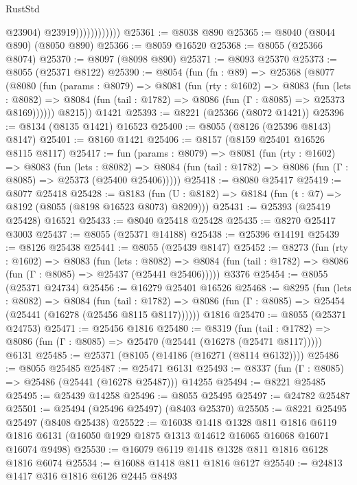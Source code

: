 \begin{lexlean}{RustStd}
\begin{coremodule}
                              @23904)
                            @23919))))))))))))
@25361 := @8038 @890
@25365 := @8040 (@8044 @890) (@8050 @890)
@25366 := @8059 @16520
@25368 := @8055 (@25366 @8074)
@25370 := @8097 (@8098 @890)
@25371 := @8093 @25370
@25373 := @8055 (@25371 @8122)
@25390 := @8054
    (fun (fn : @89) =>
    @25368
      (@8077
        (@8080
          (fun (params : @8079) =>
          @8081
            (fun (rty : @1602) =>
            @8083
              (fun (lets : @8082) =>
              @8084 (fun (tail : @1782) => @8086 (fun (Γ : @8085) => @25373 @8169))))))
        @8215))
    @1421
@25393 := @8221 (@25366 (@8072 @1421))
@25396 := @8134 (@8135 @1421) @16523
@25400 := @8055 (@8126 (@25396 @8143) @8147)
@25401 := @8160 @1421
@25406 := @8157 (@8159 @25401 @16526 @8115 @8117)
@25417 := fun (params : @8079) =>
  @8081
    (fun (rty : @1602) =>
    @8083
      (fun (lets : @8082) =>
      @8084 (fun (tail : @1782) => @8086 (fun (Γ : @8085) => @25373 (@25400 @25406)))))
@25418 := @8080 @25417
@25419 := @8077 @25418
@25428 := @8183
    (fun (U : @8182) => @8184 (fun (t : @7) => @8192 (@8055 (@8198 @16523 @8073) @8209)))
@25431 := @25393 (@25419 @25428) @16521
@25433 := @8040 @25418 @25428
@25435 := @8270 @25417 @3003
@25437 := @8055 (@25371 @14188)
@25438 := @25396 @14191
@25439 := @8126 @25438
@25441 := @8055 (@25439 @8147)
@25452 := @8273
    (fun (rty : @1602) =>
    @8083
      (fun (lets : @8082) =>
      @8084 (fun (tail : @1782) => @8086 (fun (Γ : @8085) => @25437 (@25441 @25406)))))
    @3376
@25454 := @8055 (@25371 @24734)
@25456 := @16279 @25401 @16526
@25468 := @8295
    (fun (lets : @8082) =>
    @8084
      (fun (tail : @1782) =>
      @8086 (fun (Γ : @8085) => @25454 (@25441 (@16278 (@25456 @8115 @8117))))))
    @1816
@25470 := @8055 (@25371 @24753)
@25471 := @25456 @1816
@25480 := @8319
    (fun (tail : @1782) => @8086 (fun (Γ : @8085) => @25470 (@25441 (@16278 (@25471 @8117)))))
    @6131
@25485 := @25371 (@8105 (@14186 (@16271 (@8114 @6132))))
@25486 := @8055 @25485
@25487 := @25471 @6131
@25493 := @8337 (fun (Γ : @8085) => @25486 (@25441 (@16278 @25487))) @14255
@25494 := @8221 @25485
@25495 := @25439 @14258
@25496 := @8055 @25495
@25497 := @24782 @25487
@25501 := @25494 (@25496 @25497) (@8403 @25370)
@25505 := @8221 @25495 @25497 (@8408 @25438)
@25522 := @16038
    @1418
    @1328
    @811
    @1816
    @6119
    @1816
    @6131
    (@16050 @1929 @1875 @1313 @14612 @16065 @16068 @16071 @16074 @9498)
@25530 := @16079 @6119 @1418 @1328 @811 @1816 @6128 @1816 @6074
@25534 := @16088 @1418 @811 @1816 @6127
@25540 := @24813 @1417 @316 @1816 @6126 @2445 @8493

\end{coremodule}
\end{lexlean}
